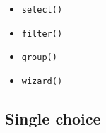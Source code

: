 \begin{itemize}
  \begin{itemize}
  \tightlist
  \item
    \texttt{s\allowbreak{}e\allowbreak{}l\allowbreak{}e\allowbreak{}c\allowbreak{}t\allowbreak{}(\allowbreak{})}
  \item
    \texttt{f\allowbreak{}i\allowbreak{}l\allowbreak{}t\allowbreak{}e\allowbreak{}r\allowbreak{}(\allowbreak{})}
  \item
    \texttt{g\allowbreak{}r\allowbreak{}o\allowbreak{}u\allowbreak{}p\allowbreak{}(\allowbreak{})}
  \item
    \texttt{w\allowbreak{}i\allowbreak{}z\allowbreak{}a\allowbreak{}r\allowbreak{}d\allowbreak{}(\allowbreak{})}
  \end{itemize}
\end{itemize}

\subsection{Single choice}\label{record-019-single-choice}

